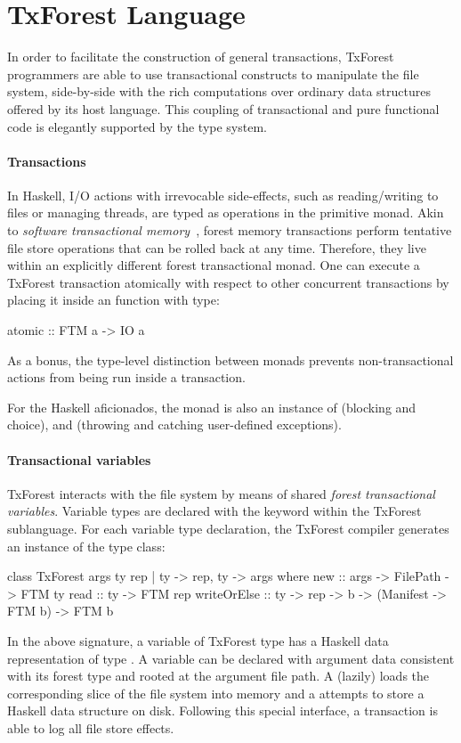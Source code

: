 
\section{TxForest Language}


In order to facilitate the construction of general transactions, TxForest programmers are able to use transactional constructs to manipulate the file system, side-by-side with the rich computations over ordinary data structures offered by its host language.
This coupling of transactional and pure functional code is elegantly supported by the type system.

\paragraph{Transactions}
In Haskell, I/O actions with irrevocable side-effects, such as reading/writing to files or managing threads, are typed as operations in the primitive  monad.
Akin to \emph{software transactional memory}~\cite{HaskellSTM}, forest memory transactions perform tentative file store operations that can be rolled  back at any time. Therefore, they live within an explicitly different  forest transactional monad.
One can execute a TxForest transaction atomically with respect to other concurrent transactions by placing it inside an  function with type:
\begin{code}
atomic :: FTM a -> IO a
\end{code}
As a bonus, the type-level distinction between monads prevents non-transactional actions from being run inside a transaction.

For the Haskell aficionados, the  monad is also an instance of  (blocking and choice),  and  (throwing and catching user-defined exceptions).

\paragraph{Transactional variables}
TxForest interacts with the file system by means of shared \emph{forest transactional variables}. Variable types are declared with the  keyword within the TxForest sublanguage. For each variable type declaration, the TxForest compiler generates an instance of the  type class:
\begin{code}
class TxForest args ty rep | ty -> rep, ty -> args where
  new         :: args -> FilePath -> FTM ty
  read        :: ty -> FTM rep
  writeOrElse :: ty -> rep -> b
              -> (Manifest -> FTM b) -> FTM b
\end{code}
In the above signature, a variable of TxForest type  has a Haskell data representation of type . A  variable can be declared with argument data consistent with its forest type and rooted at the argument file path. A  (lazily) loads the corresponding slice of the file system into memory and a  attempts to store a Haskell data structure on disk.
Following this special interface, a transaction is able to log all file store effects.

